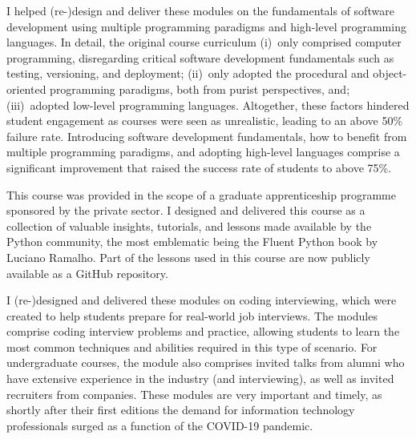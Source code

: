 %
{I helped (re-)design and deliver these modules on the fundamentals of software development using multiple programming paradigms and high-level programming languages. In detail, the original course curriculum (i)~only comprised computer programming, disregarding critical software development fundamentals such as testing, versioning, and deployment; (ii)~only adopted the procedural and object-oriented programming paradigms, both from purist perspectives, and; (iii)~adopted low-level programming languages. Altogether, these factors hindered student engagement as courses were seen as unrealistic, leading to an above 50\% failure rate. Introducing software development fundamentals, how to benefit from multiple programming paradigms, and adopting high-level languages comprise a significant improvement that raised the success rate of students to above 75\%.}

\cvline{}{\hrule}

%
{This course was provided in the scope of a graduate apprenticeship programme sponsored by the private sector. I designed and delivered this course as a collection of valuable insights, tutorials, and lessons made available by the Python community, the most emblematic being the Fluent Python book by Luciano Ramalho. Part of the lessons used in this course are now publicly available as a GitHub repository.}

\cvline{}{\hrule}

%
{I (re-)designed and delivered these modules on coding interviewing, which were created to help students prepare for real-world job interviews. The modules comprise coding interview problems and practice, allowing students to learn the most common techniques and abilities required in this type of scenario. For undergraduate courses, the module also comprises invited talks from alumni who have extensive experience in the industry (and interviewing), as well as invited recruiters from companies. These modules are very important and timely, as shortly after their first editions the demand for information technology professionals surged as a function of the COVID-19 pandemic.}

